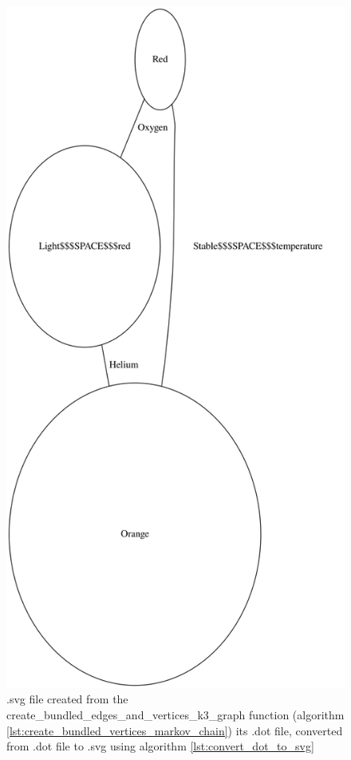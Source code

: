 \begin{figure}[!htbp]
  \includegraphics[]{create_bundled_edges_and_vertices_k3_graph.png}
  \caption{
    .svg file created from the create\_bundled\_edges\_and\_vertices\_k3\_graph function
    (algorithm \ref{lst:create_bundled_vertices_markov_chain}) 
    its .dot file, converted from .dot file to .svg using algorithm 
    \ref{lst:convert_dot_to_svg}
  }
  \label{fig:create_bundled_edges_and_vertices_k3_graph.svg}
\end{figure}

